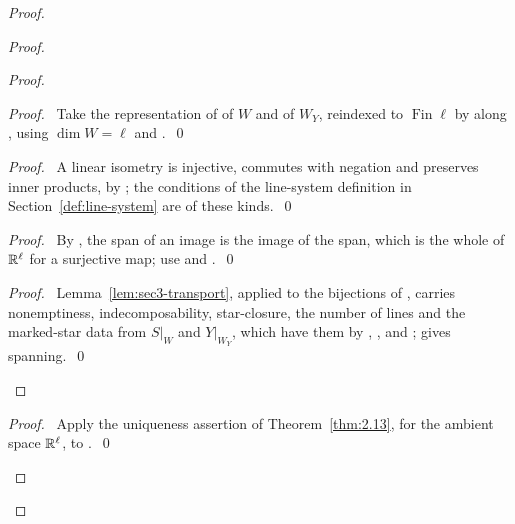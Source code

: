 \begin{proof}
\begin{proof}
  \begin{proof}
   \begin{proof}\pf\ Take the representation  of
     of $W$ and of $W_Y$, reindexed to $\operatorname{Fin}\ell$
    by  along , using $\dim W=\ell$ and
    .~\qed\end{proof}
   \begin{proof}\pf\ A linear isometry is injective, commutes with negation and
    preserves inner products, by ; the conditions of
    the line-system definition in Section~\ref{def:line-system} are of these kinds.~\qed\end{proof}
   \begin{proof}\pf\ By , the span of an image is the image
    of the span, which is the whole of ${\mathbb R}^\ell$ for a surjective map; use
     and .~\qed\end{proof}
   \qedstep
   \begin{proof}\pf\ Lemma~\ref{lem:sec3-transport}, applied to the bijections of
    , carries nonemptiness, indecomposability, star-closure, the
    number of lines and the marked-star data from $S|_W$ and $Y|_{W_Y}$, which have them
    by , ,  and
    ;  gives spanning.~\qed\end{proof}
  \end{proof}
  \begin{proof}\pf\ Apply the uniqueness assertion of Theorem~\ref{thm:2.13}, for the
   ambient space ${\mathbb R}^\ell$, to .~\qed\end{proof}

\end{proof}
\end{proof}
